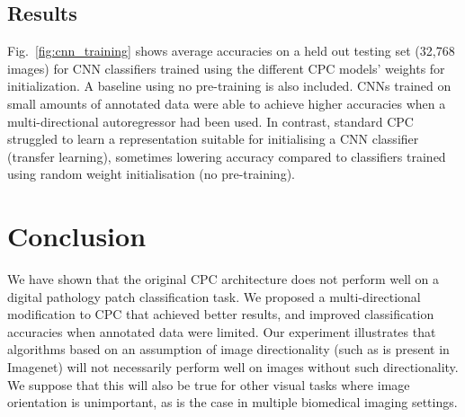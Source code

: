 \subsection{Results}
Fig.~\ref{fig:cnn_training} shows average accuracies on a held out testing set (32,768 images) for CNN classifiers trained using the different CPC models' weights for initialization. A baseline using no pre-training is also included. CNNs trained on small amounts of annotated data were able to achieve higher accuracies when a multi-directional autoregressor had been used.  In contrast, standard CPC struggled to learn a representation suitable for initialising a CNN classifier (transfer learning), sometimes lowering accuracy compared to classifiers trained using random weight initialisation (no pre-training).

\begin{table}
	\caption{Mean test accuracies of the CNN classifiers (standard deviations in parentheses).}
	\label{tab:cnn_results}
\end{table}



\section{Conclusion}
We have shown that the original CPC architecture does not perform well on a digital pathology patch classification task. We proposed a multi-directional modification to CPC that achieved better results, and improved classification accuracies when annotated data were limited. Our experiment illustrates that algorithms based on an assumption of image directionality (such as is present in Imagenet) will not necessarily perform well on images without such directionality. We suppose that this will also be true for other visual tasks where image orientation is unimportant, as is the case in multiple biomedical imaging settings.  
